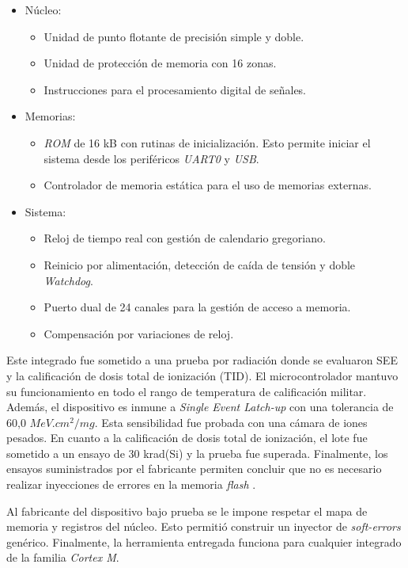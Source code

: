 \begin{itemize}
    \item Núcleo:
        \begin{itemize}
            \item Unidad de punto flotante de precisión simple y doble.
            \item Unidad de protección de memoria con 16 zonas.
            \item Instrucciones para el procesamiento digital de señales.
        \end{itemize}
    \item Memorias:
        \begin{itemize}
            \item \emph{ROM} de 16 kB con rutinas de inicialización. Esto permite iniciar el sistema desde los periféricos \emph{UART0} y \emph{USB}.
            \item Controlador de memoria estática para el uso de memorias externas.
        \end{itemize}
    \item Sistema:
        \begin{itemize}
            \item Reloj de tiempo real con gestión de calendario gregoriano.
            \item Reinicio por alimentación, detección de caída de tensión y doble \emph{Watchdog}.
            \item Puerto dual de 24 canales para la gestión de acceso a memoria.
            \item Compensación por variaciones de reloj.
        \end{itemize}
\end{itemize}

Este integrado fue sometido a una prueba por radiación donde se evaluaron SEE y la calificación de dosis total de ionización (TID).
El microcontrolador mantuvo su funcionamiento en todo el rango de temperatura de calificación militar.
Además, el dispositivo es inmune a \emph{Single Event Latch-up} con una tolerancia de 60,0 $MeV.cm^2/mg$.
Esta sensibilidad fue probada con una cámara de iones pesados.
En cuanto a la calificación de dosis total de ionización, el lote fue sometido a un ensayo de 30 krad(Si) y la prueba fue superada.
Finalmente, los ensayos suministrados por el fabricante permiten concluir que no es necesario realizar inyecciones de errores en la memoria \emph{flash} \citep{ARTICLE:dutrad}.

Al fabricante del dispositivo bajo prueba se le impone respetar el mapa de memoria y registros del núcleo.
Esto permitió construir un inyector de \emph{soft-errors} genérico.
Finalmente, la herramienta entregada funciona para cualquier integrado de la familia \emph{Cortex M}.

